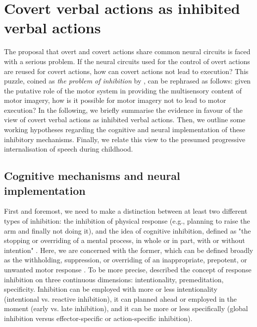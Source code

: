 \documentclass[utf8]{template/frontiersSCNS} %
\begin{document}
\section{Covert verbal actions as inhibited verbal actions}

The proposal that overt and covert actions share common neural circuits is faced with a serious problem. If the neural circuits used for the control of overt actions are reused for covert actions, how can covert actions not lead to execution? This puzzle, coined as \textit{the problem of inhibition} by \cite{jeannerod_neural_2001}, can be rephrased as follows: given the putative role of the motor system in providing the multisensory content of motor imagery, how is it possible for motor imagery not to lead to motor execution? In the following, we briefly summarise the evidence in favour of the view of covert verbal actions as inhibited verbal actions. Then, we outline some working hypotheses regarding the cognitive and neural implementation of these inhibitory mechanisms. Finally, we relate this view to the presumed progressive internalisation of speech during childhood.

\subsection{Cognitive mechanisms and neural implementation}

First and foremost, we need to make a distinction between at least two different types of inhibition: the inhibition of physical response (e.g., planning to raise the arm and finally not doing it), and the idea of cognitive inhibition, defined as "the stopping or overriding of a mental process, in whole or in part, with or without intention" \citep{gorfein_concept_2007}. Here, we are concerned with the former, which can be defined broadly as the withholding, suppression, or overriding of an inappropriate, prepotent, or unwanted motor response \citep{aron_neural_2007, oshea_go_2018}. To be more precise, \cite{ridderinkhof_dont_2014} described the concept of response inhibition on three continuous dimensions: intentionality, premeditation, specificity. Inhibition can be employed with more or less intentionality (intentional vs. reactive inhibition), it can planned ahead or employed in the moment (early vs. late inhibition), and it can be more or less specifically (global inhibition versus effector-specific or action-specific inhibition).
\end{document}
